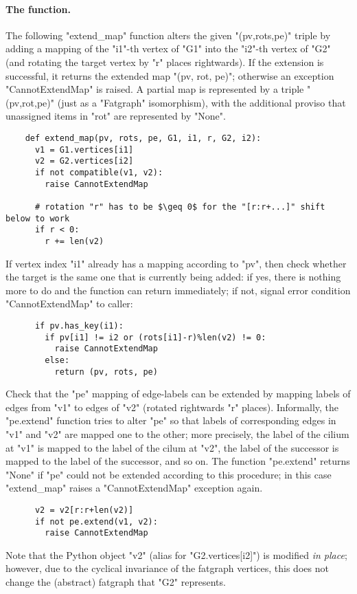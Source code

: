 \paragraph{The  function.}
The following "extend_map" function alters the given "(pv,rots,pe)"
triple by adding a mapping of the "i1"-th vertex of "G1" into the
"i2"-th vertex of "G2" (and rotating the target vertex by "r" places
rightwards).  If the extension is successful, it returns the extended
map "(pv, rot, pe)"; otherwise an exception "CannotExtendMap" is
raised.  A partial map is represented by a triple "(pv,rot,pe)" (just
as a "Fatgraph" isomorphism), with the additional proviso that
unassigned items in "rot" are represented by "None".
\begin{lstlisting}
    def extend_map(pv, rots, pe, G1, i1, r, G2, i2):
      v1 = G1.vertices[i1]
      v2 = G2.vertices[i2]
      if not compatible(v1, v2):
        raise CannotExtendMap

      # rotation "r" has to be $\geq 0$ for the "[r:r+...]" shift below to work
      if r < 0:
        r += len(v2)

\end{lstlisting}
If vertex index "i1" already has a mapping according to "pv", then
check whether the target is the same one that is currently being
added: if yes, there is nothing more to do and the function can return
immediately; if not, signal error condition "CannotExtendMap" to
caller:
\begin{lstlisting}
      if pv.has_key(i1):
        if pv[i1] != i2 or (rots[i1]-r)%len(v2) != 0:
          raise CannotExtendMap
        else:
          return (pv, rots, pe)

\end{lstlisting}
Check that the "pe" mapping of edge-labels can be extended by mapping
labels of edges from "v1" to edges of "v2" (rotated rightwards "r"
places).  Informally, the "pe.extend" function tries to alter "pe" so
that labels of corresponding edges in "v1" and "v2" are mapped one to
the other; more precisely, the label of the cilium at "v1" is mapped
to the label of the cilum at "v2", the label of the successor is
mapped to the label of the successor, and so on.  The function
"pe.extend" returns "None" if "pe" could not be extended according to
this procedure; in this case "extend_map" raises a "CannotExtendMap"
exception again.
\begin{lstlisting}
      v2 = v2[r:r+len(v2)]
      if not pe.extend(v1, v2):
        raise CannotExtendMap
\end{lstlisting}
Note that the Python object "v2" (alias for "G2.vertices[i2]") is
modified \emph{in place}; however, due to the cyclical invariance of
the fatgraph vertices, this does not change the (abstract) fatgraph
that "G2" represents.

